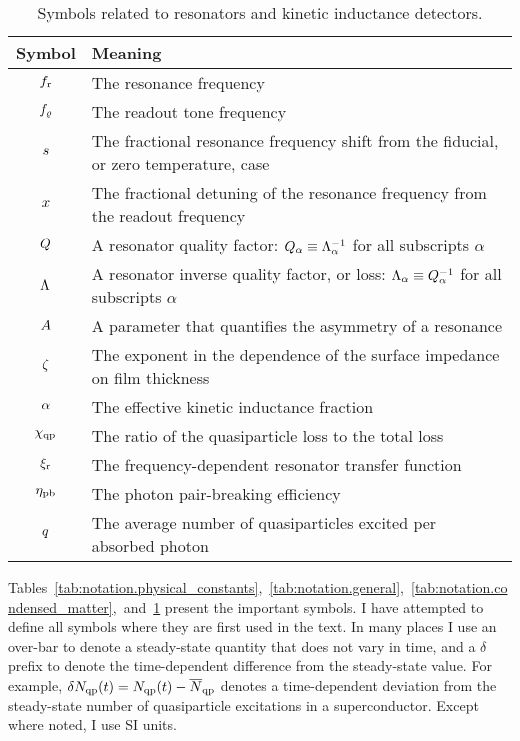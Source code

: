 \begin{table}[tb]
\centering
\caption
{Symbols related to resonators and kinetic inductance detectors.}
\renewcommand{\arraystretch}{1.2}
\begin{tabular}{c l}
\toprule
Symbol & Meaning \\
\midrule
$f_{\mathrm{r}}$ & The resonance frequency \\
$f_\varrho$ & The readout tone frequency \\
$s$ & The fractional resonance frequency shift from the fiducial, or zero temperature, case \\
$x$ & The fractional detuning of the resonance frequency from the readout frequency \\
$Q$ & A resonator quality factor: $Q_\alpha \equiv \Lambda_\alpha^{-1}$ for all subscripts $\alpha$ \\
$\Lambda$ & A resonator inverse quality factor, or loss: $\Lambda_\alpha \equiv Q_\alpha^{-1}$ for all subscripts $\alpha$ \\
$A$ & A parameter that quantifies the asymmetry of a resonance \\
$\zeta$ & The exponent in the dependence of the surface impedance on film thickness \\
$\alpha$ & The effective kinetic inductance fraction \\
$\chi_{\mathrm{qp}}$ & The ratio of the quasiparticle loss to the total loss \\
$\xi_{\mathrm{r}}$ & The frequency-dependent resonator transfer function \\
$\eta_\mathrm{pb}$ & The photon pair-breaking efficiency \\
$q$ & The average number of quasiparticles excited per absorbed photon \\
\bottomrule
\end{tabular}
\label{tab:notation.resonator}
\end{table}

Tables~\ref{tab:notation.physical_constants},~\ref{tab:notation.general},~\ref{tab:notation.condensed_matter},~and~\ref{tab:notation.resonator} present the important symbols.
I have attempted to define all symbols where they are first used in the text.
In many places I use an over-bar to denote a steady-state quantity that does not vary in time, and a $\delta$ prefix to denote the time-dependent difference from the steady-state value.
For example, 
$\delta N_{\mathrm{qp}}(t) = N_{\mathrm{qp}}(t) - \overline{N}_{\mathrm{qp}}$
denotes a time-dependent deviation from the steady-state number of quasiparticle excitations in a superconductor.
Except where noted, I use SI units.
